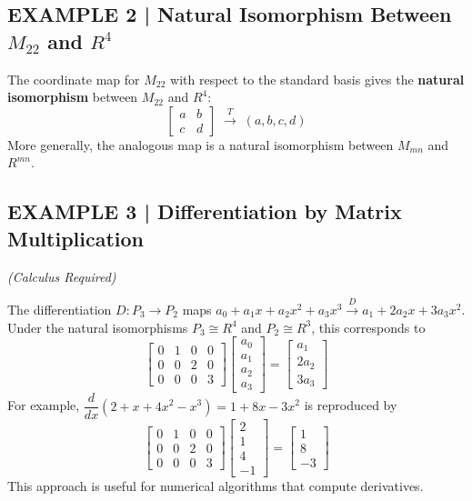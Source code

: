 \documentclass{article}
\begin{document}
\subsection*{EXAMPLE 2 | Natural Isomorphism Between $M_{22}$ and $R^4$}

The coordinate map for $M_{22}$ with respect to the standard basis gives the \textbf{natural
isomorphism} between $M_{22}$ and $R^4$:
\[
  \begin{bmatrix}a&b\\c&d\end{bmatrix} \;\xrightarrow{\;T\;}\; (a,b,c,d)
\]
More generally, the analogous map is a natural isomorphism between $M_{mn}$ and $R^{mn}$.

\subsection*{EXAMPLE 3 | Differentiation by Matrix Multiplication}
\textit{(Calculus Required)}

The differentiation $D : P_3 \to P_2$ maps
$a_0+a_1x+a_2x^2+a_3x^3 \xrightarrow{D} a_1+2a_2x+3a_3x^2$.
Under the natural isomorphisms $P_3\cong R^4$ and $P_2\cong R^3$, this corresponds to
\[
  \begin{bmatrix}0&1&0&0\\0&0&2&0\\0&0&0&3\end{bmatrix}
  \begin{bmatrix}a_0\\a_1\\a_2\\a_3\end{bmatrix}
  =
  \begin{bmatrix}a_1\\2a_2\\3a_3\end{bmatrix}
\]
For example, $\dfrac{d}{dx}(2+x+4x^2-x^3)=1+8x-3x^2$ is reproduced by
\[
  \begin{bmatrix}0&1&0&0\\0&0&2&0\\0&0&0&3\end{bmatrix}
  \begin{bmatrix}2\\1\\4\\-1\end{bmatrix}
  =
  \begin{bmatrix}1\\8\\-3\end{bmatrix}
\]
This approach is useful for numerical algorithms that compute derivatives.
\end{document}
